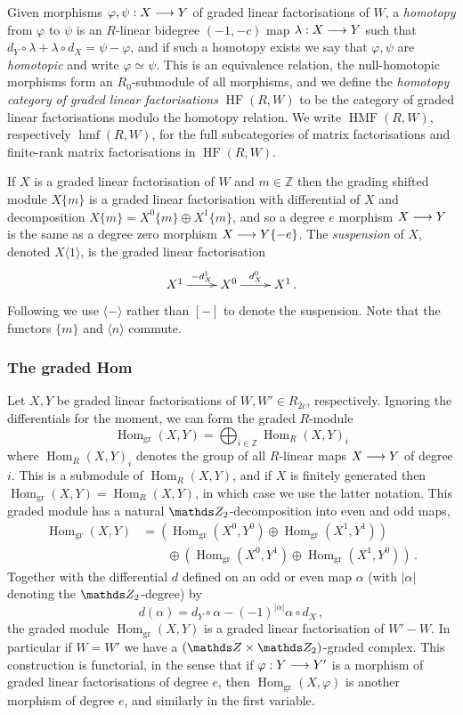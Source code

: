 \documentclass{compositio}
\theoremstyle{definition}
\numberwithin{equation}{section}
\def\Hom{\operatorname{Hom}}
\DeclareMathOperator{\hmf}{hmf}
\DeclareMathOperator{\HMF}{HMF}
\DeclareMathOperator{\HF}{HF}
\begin{document}
Given morphisms $\varphi, \psi: X \longrightarrow Y$ of graded linear factorisations of $W$, a \emph{homotopy} from $\varphi$ to $\psi$ is an $R$-linear bidegree $(-1,-c)$ map $\lambda: X \longrightarrow Y$ such that $d_Y \circ \lambda + \lambda \circ d_X = \psi - \varphi$, and if such a homotopy exists we say that $\varphi, \psi$ are \emph{homotopic} and write $\varphi \simeq \psi$. This is an equivalence relation, the null-homotopic morphisms form an $R_0$-submodule of all morphisms, and we define the \emph{homotopy category of graded linear factorisations} $\HF(R,W)$ to be the category of graded linear factorisations modulo the homotopy relation. We write $\HMF(R,W)$, respectively $\hmf(R,W)$, for the full subcategories of matrix factorisations and finite-rank matrix factorisations in $\HF(R,W)$. 

If $X$ is a graded linear factorisation of $W$ and $m \in \mathds{Z}$ then the grading shifted module $X\{ m \}$ is a graded linear factorisation with differential of $X$ and decomposition $X\{ m \} = X^0\{ m \} \oplus X^1\{ m \}$, and so a degree $e$ morphism $X \longrightarrow Y$ is the same as a degree zero morphism $X \longrightarrow Y\{-e\}$. The \emph{suspension} of $X$, denoted $X\langle 1 \rangle$, is the graded linear factorisation
\[
\xymatrix{
X^1 \ar[r]^-{-d_X^1} & X^0 \ar[r]^-{d_X^0} & X^1\,.
}
\]
Following \cite{kr0401268} we use $\langle - \rangle$ rather than $[-]$ to denote the suspension. Note that the functors $\{ m \}$ and $\langle n \rangle$ commute.

\subsubsection{The graded Hom} Let $X,Y$ be graded linear factorisations of $W,W' \in R_{2c}$, respectively. Ignoring the differentials for the moment, we can form the graded $R$-module
\[
\Hom_{\text{gr}}(X,Y) = \bigoplus_{i \in \mathds{Z}} \Hom_R(X,Y)_i
\]
where $\Hom_R(X,Y)_i$ denotes the group of all $R$-linear maps $X \longrightarrow Y$ of degree $i$. This is a submodule of $\Hom_R(X,Y)$, and if $X$ is finitely generated then $\Hom_{\text{gr}}(X,Y) = \Hom_R(X,Y)$, in which case we use the latter notation. This graded module has a natural $\Ztwo$-decomposition into even and odd maps, 
\begin{align*}
\Hom_{\text{gr}}(X,Y) &= \left( \Hom_{\text{gr}}(X^0, Y^0) \oplus \Hom_{\text{gr}}(X^1, Y^1) \right)\\
&\qquad \oplus \left( \Hom_{\text{gr}}(X^0, Y^1) \oplus \Hom_{\text{gr}}(X^1, Y^0) \right)\,.
\end{align*}
Together with the differential $d$ defined on an odd or even map $\alpha$ (with $|\alpha|$ denoting the $\Ztwo$-degree) by
\[
d(\alpha) = d_Y \circ \alpha - (-1)^{|\alpha|} \alpha \circ d_X \, ,
\]
the graded module $\Hom_{\text{gr}}(X,Y)$ is a graded linear factorisation of $W' - W$. In particular if $W = W'$ we have a $(\ZZ \times \Ztwo)$-graded complex. This construction is functorial, in the sense that if $\varphi: Y \longrightarrow Y'$ is a morphism of graded linear factorisations of degree $e$, then $\Hom_{\text{gr}}(X,\varphi)$ is another morphism of degree $e$, and similarly in the first variable.
\end{document}
